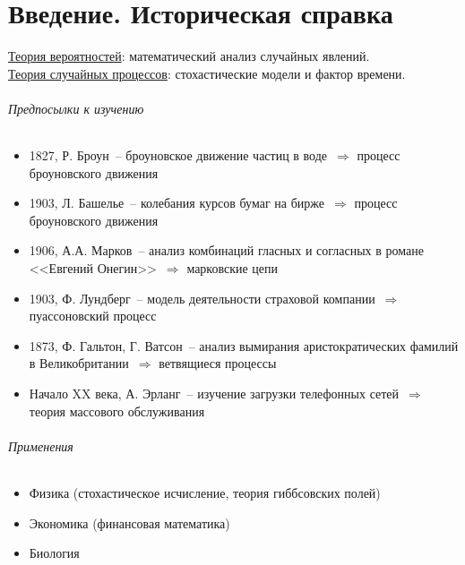 \part*{Введение. Историческая справка}
\underline{Теория вероятностей}: математический анализ случайных явлений.\\
\underline{Теория случайных процессов}: стохастические модели и фактор времени.

\paragraph{Предпосылки к изучению}
\begin{itemize}
\item 1827, Р. Броун~-- броуновское движение частиц в воде~$\Rightarrow$ процесс броуновского движения
\item 1903, Л. Башелье~-- колебания курсов бумаг на бирже~$\Rightarrow$ процесс броуновского движения
\item 1906, А.А. Марков~-- анализ комбинаций гласных и согласных в романе <<Евгений Онегин>>~$\Rightarrow$ марковские цепи
\item 1903, Ф. Лундберг~-- модель деятельности страховой компании~$\Rightarrow$ пуассоновский процесс
\item 1873, Ф. Гальтон, Г. Ватсон~-- анализ вымирания аристократических фамилий в Великобритании~$\Rightarrow$ ветвящиеся процессы
\item Начало XX века, А. Эрланг~-- изучение загрузки телефонных сетей~$\Rightarrow$ теория массового обслуживания
\end{itemize}

\paragraph{Применения}
\begin{itemize}
\item Физика (стохастическое исчисление, теория гиббсовских полей)
\item Экономика (финансовая математика)
\item Биология
\end{itemize}
